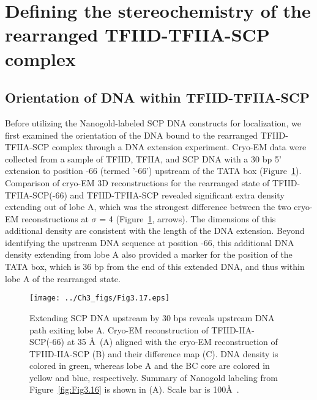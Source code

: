 \section{Defining the stereochemistry of the rearranged TFIID-TFIIA-SCP complex}

\subsection{Orientation of DNA within TFIID-TFIIA-SCP}
Before utilizing the Nanogold-labeled SCP DNA constructs for localization, we first examined the orientation of the DNA bound to the rearranged TFIID-TFIIA-SCP complex through a DNA extension experiment. Cryo-EM data were collected from a sample of TFIID, TFIIA, and SCP DNA with a 30 bp 5' extension to position -66 (termed '-66') upstream of the TATA box (Figure~\ref{fig:Fig3.17}). Comparison of cryo-EM 3D reconstructions for the rearranged state of TFIID-TFIIA-SCP(-66) and TFIID-TFIIA-SCP revealed significant extra density extending out of lobe A, which was the strongest difference between the two cryo-EM reconstructions at $\sigma$ = 4 (Figure~\ref{fig:Fig3.17}, arrows). The dimensions of this additional density are consistent with the length of the DNA extension. Beyond identifying the upstream DNA sequence at position -66, this additional DNA density extending from lobe A also provided a marker for the position of the TATA box, which is 36 bp from the end of this extended DNA, and thus within lobe A of the rearranged state.\\
\begin{figure}
\centering
\texttt{[image: ../Ch3\_figs/Fig3.17.eps]}
\caption[Extending SCP DNA upstream by 30 bps reveals upstream DNA path exiting lobe A]{Extending SCP DNA upstream by 30 bps reveals upstream DNA path exiting lobe A. Cryo-EM reconstruction of TFIID-IIA-SCP(-66) at 35 \AA\ (A) aligned with the cryo-EM reconstruction of TFIID-IIA-SCP (B) and their difference map (C). DNA density is colored in green, whereas lobe A and the BC core are colored in yellow and blue, respectively. Summary of Nanogold labeling from Figure~\ref{fig:Fig3.16} is shown in (A). Scale bar is 100\AA\ . }
\label{fig:Fig3.17}
\end{figure}
